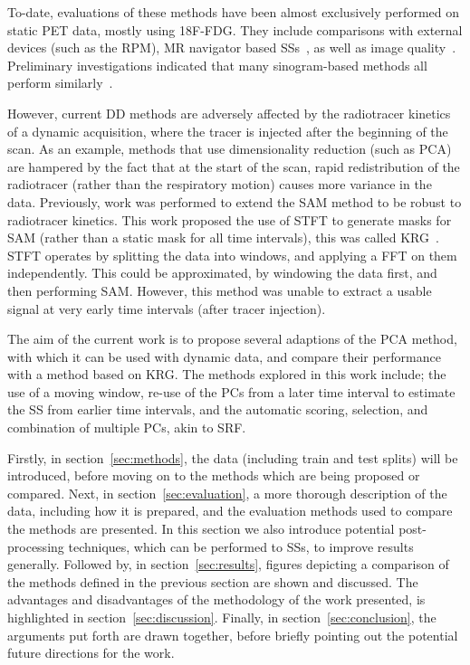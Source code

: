     To-date, evaluations of these methods have been almost exclusively performed on static \gls{PET} data, mostly using \gls{18F-FDG}. They include comparisons with external devices (such as the \gls{RPM}), \gls{MR} navigator based \glspl{SS}~\parencite{Manber2015PracticalPET/MR}, as well as image quality~\parencite{Buther2020ClinicalMotion, Walker2019EvaluationImaging}. Preliminary investigations indicated that many sinogram-based methods all perform similarly~\parencite{Thielemans2013ComparisonData}.
    
    However, current \gls{DD} methods are adversely affected by the radiotracer kinetics of a dynamic acquisition, where the tracer is injected after the beginning of the scan. As an example, methods that use dimensionality reduction (such as \gls{PCA}) are hampered by the fact that at the start of the scan, rapid redistribution of the radiotracer (rather than the respiratory motion) causes more variance in the data. Previously, work was performed to extend the \gls{SAM} method to be robust to radiotracer kinetics. This work proposed the use of \gls{STFT} to generate masks for \gls{SAM} (rather than a static mask for all time intervals), this was called \gls{KRG}~\parencite{Schleyer2014}. \gls{STFT} operates by splitting the data into windows, and applying a \gls{FFT} on them independently. This could be approximated, by windowing the data first, and then performing \gls{SAM}. However, this method was unable to extract a usable signal at very early time intervals (after tracer injection).
    
    The aim of the current work is to propose several adaptions of the \gls{PCA} method, with which it can be used with dynamic data, and compare their performance with a method based on \gls{KRG}. The methods explored in this work include; the use of a moving window, re-use of the \glspl{PC} from a later time interval to estimate the \gls{SS} from earlier time intervals, and the automatic scoring, selection, and combination of multiple \glspl{PC}, akin to \gls{SRF}.

    Firstly, in section~\ref{sec:methods}, the data (including train and test splits) will be introduced, before moving on to the methods which are being proposed or compared. Next, in section~\ref{sec:evaluation}, a more thorough description of the data, including how it is prepared, and the evaluation methods used to compare the methods are presented. In this section we also introduce potential post-processing techniques, which can be performed to \glspl{SS}, to improve results generally. Followed by, in section~\ref{sec:results}, figures depicting a comparison of the methods defined in the previous section are shown and discussed. The advantages and disadvantages of the methodology of the work presented, is highlighted in section~\ref{sec:discussion}. Finally, in section~\ref{sec:conclusion}, the arguments put forth are drawn together, before briefly pointing out the potential future directions for the work.
    

